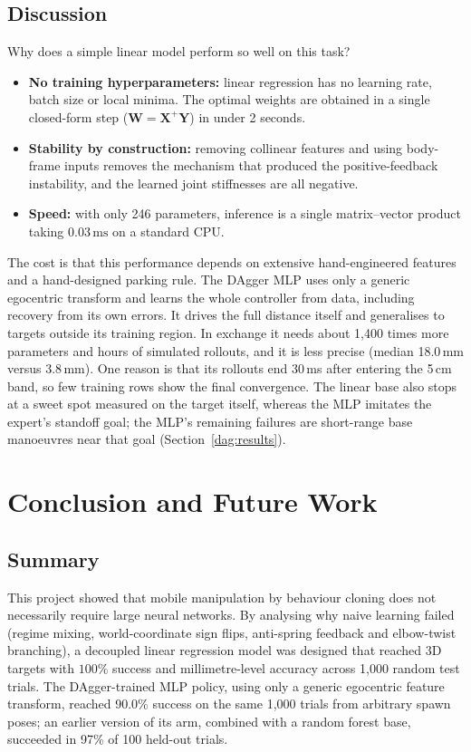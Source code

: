 \documentclass[conference]{IEEEtran}
\begin{document}
\subsection{Discussion}
Why does a simple linear model perform so well on this task?
\begin{itemize}
    \item \textbf{No training hyperparameters:} linear regression has no learning rate, batch size or local minima. The optimal weights are obtained in a single closed-form step ($\mathbf{W} = \mathbf{X}^+ \mathbf{Y}$) in under 2 seconds.
    \item \textbf{Stability by construction:} removing collinear features and using body-frame inputs removes the mechanism that produced the positive-feedback instability, and the learned joint stiffnesses are all negative.
    \item \textbf{Speed:} with only 246 parameters, inference is a single matrix--vector product taking $0.03\,\text{ms}$ on a standard CPU.
\end{itemize}
The cost is that this performance depends on extensive hand-engineered features and a hand-designed parking rule. The DAgger MLP uses only a generic egocentric transform and learns the whole controller from data, including recovery from its own errors. It drives the full distance itself and generalises to targets outside its training region. In exchange it needs about 1,400 times more parameters and hours of simulated rollouts, and it is less precise (median 18.0\,mm versus 3.8\,mm). One reason is that its rollouts end 30\,ms after entering the 5\,cm band, so few training rows show the final convergence. The linear base also stops at a sweet spot measured on the target itself, whereas the MLP imitates the expert's standoff goal; the MLP's remaining failures are short-range base manoeuvres near that goal (Section~\ref{dag:results}).

\section{Conclusion and Future Work}
\label{sec:conclusion}

\subsection{Summary}
This project showed that mobile manipulation by behaviour cloning does not necessarily require large neural networks. By analysing why naive learning failed (regime mixing, world-coordinate sign flips, anti-spring feedback and elbow-twist branching), a decoupled linear regression model was designed that reached 3D targets with $100\%$ success and millimetre-level accuracy across 1,000 random test trials. The DAgger-trained MLP policy, using only a generic egocentric feature transform, reached 90.0\% success on the same 1,000 trials from arbitrary spawn poses; an earlier version of its arm, combined with a random forest base, succeeded in 97\% of 100 held-out trials.
\end{document}
